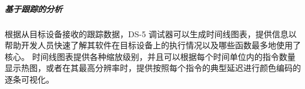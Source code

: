 
\subparagraph*{基于跟踪的分析}

根据从目标设备接收的跟踪数据，DS-5 调试器可以生成时间线图表，提供信息以帮助开发人员快速了解其软件在目标设备上的执行情况以及哪些函数最多地使用了核心。
时间线图表提供各种缩放级别，并且可以根据每个时间单位内的指令数量显示热图，或者在其最高分辨率时，提供按照每个指令的典型延迟进行颜色编码的逐条可视化。

